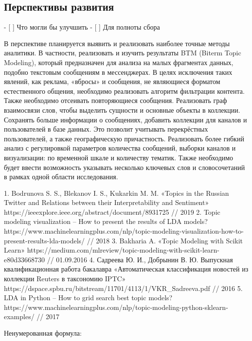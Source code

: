 \documentclass[a4paper,article,14pt]{extarticle}
\begin{document}
\subsection{Перспективы развития}

        - [ ] Что могли бы улучшить
        - [ ] Для полноты сбора



В перспективе планируется выявить и реализовать наиболее точные методы аналитики. В частности, реализовать и изучить результаты BTM (Biterm Topic Modeling), который предназначен для анализа на малых фрагментах данных, подобно текстовым сообщениям в мессенджерах.
	В целях исключения таких явлений, как реклама, «вбросы» и сообщения, не являющиеся форматом естественного общения, необходимо реализовать алгоритм фильтрации контента. Также необходимо отсеивать повторяющиеся сообщения.
	Реализовать граф взаимосвязи слов, чтобы выделить сущности и основные объекты в коллекции.
	Сохранять больше информации о сообщениях, добавить коллекции для каналов и пользователей в базе данных. Это позволит учитывать перекрёстных пользователей, а также географическую причастность.
	Реализовать более гибкий анализ с регулировкой параметров количества сообщений, выборки каналов и визуализации: по временной шкале и количеству тематик. Также необходимо будет ввести возможность указывать несколько ключевых слов и словосочетаний в рамках одной области исследования.




1.	Bodrunova S. S., Blekanov I. S., Kukarkin M. M. «Topics in the Russian Twitter and Relations between their Interpretability and Sentiment» https://ieeexplore.ieee.org/abstract/document/8931725 // 2019
2.	Topic modeling visualization – How to present the results of LDA models? https://www.machinelearningplus.com/nlp/topic-modeling-visualization-how-to-present-results-lda-models/ // 2018
3.	Bakharia A. «Topic Modeling with Scikit Learn» https://medium.com/mlreview/topic-modeling-with-scikit-learn-e80d33668730 // 01.09.2016
4.	Садреева Ю. И., Добрынин В. Ю. Выпускная квалификационная работа бакалавра «Автоматическая классификация новостей из коллекции Reuters в таксономию IPTC» https://dspace.spbu.ru/bitstream/11701/4113/1/VKR\_Sadreeva.pdf // 2016
5.	LDA in Python – How to grid search best topic models? https://www.machinelearningplus.com/nlp/topic-modeling-python-sklearn-examples/ // 2017



Ненумерованная формула:
\end{document}
